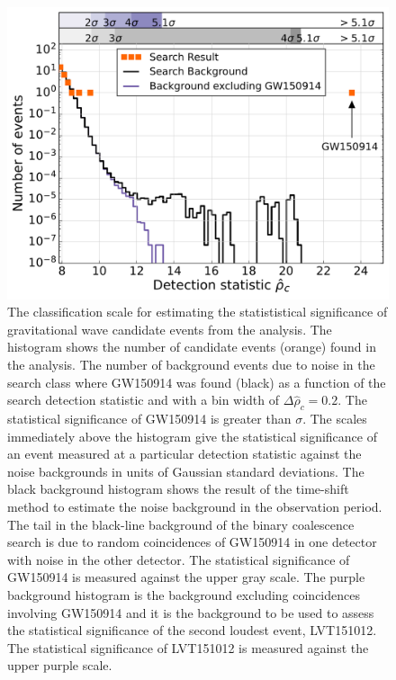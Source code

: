 \begin{figure}[t!]
\centering
\includegraphics[width=\textwidth]{figs/chapter2/pycbc-hist-0p1s-sigmas.pdf}
\caption{The classification scale for estimating the statististical significance of gravitational
wave candidate events from the \pycbc{} analysis. The histogram shows
the number of candidate events (orange) found in the analysis. The number
of background events
due to noise in the search class where GW150914 was found (black) as a
function of the search detection statistic and with a bin width of $\Delta
\hat{\rho}_c = 0.2$. The statistical significance of GW150914 is greater than
{\CBCEVENTSIGMA} $\sigma$.  The scales immediately above the histogram give
the statistical significance of an event measured at a particular detection statistic
against the noise backgrounds in
units of Gaussian standard deviations.  The
black background histogram shows the result of the time-shift method to
estimate the noise background in the observation period. The tail in the
black-line background of the binary coalescence search is due to random
coincidences of GW150914 in one detector with noise in the other detector. The
statistical significance of GW150914 is measured against the upper gray scale.  The purple
background histogram is the background excluding coincidences involving
GW150914 and it is the background to be used to assess the statistical significance of the
second loudest event, LVT151012. The statistical significance of LVT151012 is measured against the
upper purple scale.}
\label{fig:both_results}
\end{figure}

